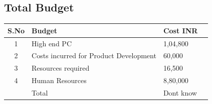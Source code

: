 \documentclass{FR16}
\begin{document}
\subsection{Total Budget}
\begin{center}
\begin{tabular}{||c ||p{6 cm}|| p{3 cm}|| c|| }
\arrayrulecolor{Azzurro}
\hline
\hline
{\bfseries S.No} & {\bfseries Budget}&  {\bfseries Cost INR} \\
\hline
\hline

1& High end PC& 1,04,800\\
\hline
\hline
2& Costs incurred for Product Development & 60,000\\
\hline
\hline
3&Resources required &16,500\\
\hline
\hline
4&Human Resources & 8,80,000\\
\hline
\hline
& Total & Dont know
\end{tabular}
\end{center}



















\newpage
\end{document}

